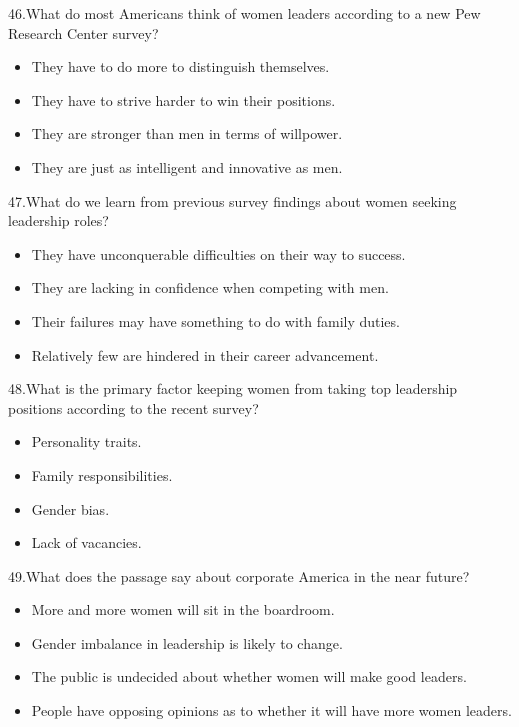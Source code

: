 \documentclass[UTF8,11pt]{ctexart}
\begin{document}
46.What do most Americans think of women leaders according to a new Pew Research Center survey?


\begin{itemize}[leftmargin=2em,itemsep=.2em,topsep=.4em]\item[A.] They have to do more to distinguish themselves.
\item[B.] They have to strive harder to win their positions.
\item[C.] They are stronger than men in terms of willpower.
\item[D.] They are just as intelligent and innovative as men.
\end{itemize}

47.What do we learn from previous survey findings about women seeking leadership roles?


\begin{itemize}[leftmargin=2em,itemsep=.2em,topsep=.4em]\item[A.] They have unconquerable difficulties on their way to success.
\end{itemize}

\begin{itemize}[leftmargin=2em,itemsep=.2em,topsep=.4em]\item[B.] They are lacking in confidence when competing with men.
\item[C.] Their failures may have something to do with family duties.
\item[D.] Relatively few are hindered in their career advancement.
\end{itemize}

48.What is the primary factor keeping women from taking top leadership positions according to the recent survey?


\begin{itemize}[leftmargin=2em,itemsep=.2em,topsep=.4em]\item[A.] Personality traits.
\item[B.] Family responsibilities.
\item[C.] Gender bias.
\item[D.] Lack of vacancies.
\end{itemize}

49.What does the passage say about corporate America in the near future?


\begin{itemize}[leftmargin=2em,itemsep=.2em,topsep=.4em]\item[A.] More and more women will sit in the boardroom.
\item[B.] Gender imbalance in leadership is likely to change.
\item[C.] The public is undecided about whether women will make good leaders.
\item[D.] People have opposing opinions as to whether it will have more women leaders.
\end{itemize}
\end{document}

